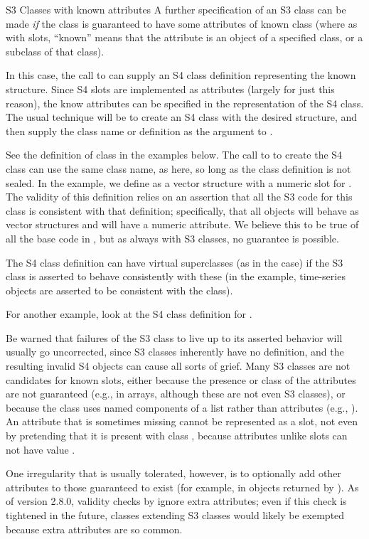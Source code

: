 \begin{Section}{S3 Classes with known attributes}
A further specification of an S3 class can be made \emph{if} the
class is guaranteed to have some attributes of known class (where as
with slots, ``known'' means that the attribute is an object of
a specified class, or a subclass of that class).

In this case, the call to  can supply an S4 class
definition representing the known structure.  Since S4 slots are
implemented as attributes (largely for just this reason), the know
attributes can be specified in the representation of the S4 class.
The usual technique will be to create an S4 class with the desired
structure, and then supply the class name or definition as the
argument  to .

See the definition of class  in the examples below.  The
call to  to create the S4 class can use the same
class name, as here, so long as the class definition is not sealed.
In the example, we define  as a vector structure with a
numeric slot for .  The validity of this definition relies
on an assertion that all the S3 code for this class is consistent with
that definition; specifically, that all  objects will
behave as vector structures and will have a numeric 
attribute. We believe this to be true of all the base code in \R{}, but
as always with S3 classes, no guarantee is possible.

The S4 class definition can  have virtual superclasses (as in
the  case) if the S3 class is asserted to behave
consistently with these (in the example, time-series objects are
asserted to be consistent with the  class).

For another example, look at the S4 class definition for .

Be warned that failures of the S3 class to live up to its asserted
behavior will usually go uncorrected, since S3 classes inherently
have no definition, and the resulting invalid S4 objects can cause
all sorts of grief.  Many S3 classes are not candidates for known
slots, either because the presence or class of the attributes are
not guaranteed  (e.g.,  in arrays, although these are
not even S3 classes), or because the class uses named components of
a list rather than attributes (e.g., ).  An attribute
that is sometimes missing cannot be represented as a slot, not even
by pretending that it is present with class , because
attributes unlike slots can not have value .

One irregularity that is usually tolerated, however, is to optionally
add other attributes to those guaranteed to exist (for example,
 in  objects returned by
).  As of version 2.8.0, validity checks by
 ignore extra attributes; even if this check
is tightened in the future, classes extending S3 classes would likely
be exempted because extra attributes are so common.
\end{Section}
